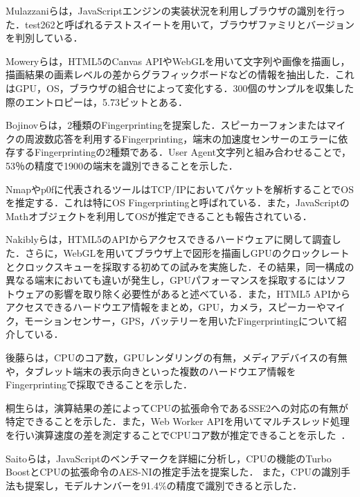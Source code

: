 Mulazzaniら\cite{mulazzani2013fast}は，JavaScriptエンジンの実装状況を利用しブラウザの識別を行った．test262と呼ばれるテストスイートを用いて，ブラウザファミリとバージョンを判別している．

Moweryら\cite{mowery2012pixel}は，HTML5のCanvas APIやWebGLを用いて文字列や画像を描画し，描画結果の画素レベルの差からグラフィックボードなどの情報を抽出した．これはGPU，OS，ブラウザの組合せによって変化する．300個のサンプルを収集した際のエントロピーは，5.73ビットとある．

Bojinovら\cite{bojinov2014mobile}は，2種類のFingerprintingを提案した．スピーカーフォンまたはマイクの周波数応答を利用するFingerprinting，端末の加速度センサーのエラーに依存するFingerprintingの2種類である．User Agent文字列と組み合わせることで，53％の精度で1900の端末を識別できることを示した．

Nmap\cite{nmap}やp0f\cite{p0f}に代表されるツールはTCP/IPにおいてパケットを解析することでOSを推定する．これは特にOS Fingerprintingと呼ばれている．また，JavaScriptのMathオブジェクトを利用してOSが推定できることも報告されている\cite{tor_bugtrack}．

Nakiblyら\cite{nakibly2015hardware}は，HTML5のAPIからアクセスできるハードウェアに関して調査した．さらに，WebGLを用いてブラウザ上で図形を描画しGPUのクロックレートとクロックスキューを採取する初めての試みを実施した．その結果，同一構成の異なる端末においても違いが発生し，GPUパフォーマンスを採取するにはソフトウェアの影響を取り除く必要性があると述べている．また，HTML5 APIからアクセスできるハードウエア情報をまとめ，GPU，カメラ，スピーカーやマイク，モーションセンサー，GPS，バッテリーを用いたFingerprintingについて紹介している．

後藤ら\cite{後藤浩行2013web}は，CPUのコア数，GPUレンダリングの有無，メディアデバイスの有無や，タブレット端末の表示向きといった複数のハードウエア情報をFingerprintingで採取できることを示した．

桐生らは，演算結果の差によってCPUの拡張命令であるSSE2への対応の有無が特定できることを示した\cite{桐生直輝2013cpu}．また，Web Worker APIを用いてマルチスレッド処理を行い演算速度の差を測定することでCPUコア数が推定できることを示した~\cite{桐生直輝2014web}．

Saitoらは，JavaScriptのベンチマークを詳細に分析し，CPUの機能のTurbo BoostとCPUの拡張命令のAES-NIの推定手法を提案した\cite{saito2016estimating}．
また，CPUの識別手法も提案し，モデルナンバーを91.4\%の精度で識別できると示した\cite{saito2017web}．

